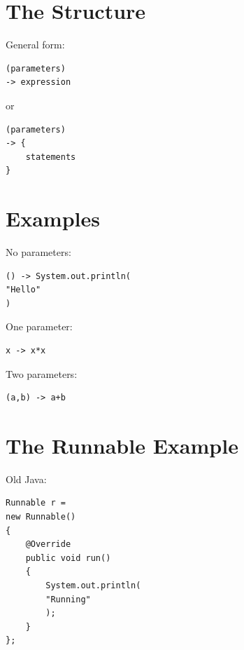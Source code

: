 \documentclass[11pt,a4paper]{book}
\begin{document}

\section{The Structure}

General form:

\begin{verbatim} 
(parameters)
-> expression
\end{verbatim}

or

\begin{verbatim} 
(parameters)
-> {
    statements
}
\end{verbatim}


\section{Examples}

No parameters:

\begin{verbatim} 
() -> System.out.println(
"Hello"
)
\end{verbatim}


One parameter:

\begin{verbatim} 
x -> x*x
\end{verbatim}


Two parameters:

\begin{verbatim} 
(a,b) -> a+b
\end{verbatim}


\section{The Runnable Example}

Old Java:

\begin{verbatim} 
Runnable r =
new Runnable()
{
    @Override
    public void run()
    {
        System.out.println(
        "Running"
        );
    }
};
\end{verbatim}
\end{document}
